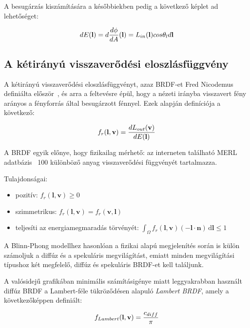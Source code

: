 \vspace{12pt}

\noindent
A besugárzás kiszámítására a későbbiekben pedig a következő képlet ad lehetőséget:

\[
dE(\mathbf{l}) = d { {d\phi} \over {dA} } (\mathbf{l}) = L_{in}(\mathbf{l}) cos\theta_l d\mathbf{l}
\]

\subsection{A kétirányú visszaverődési eloszlásfüggvény}

A kétirányú visszaverődési eloszlásfüggvényt, azaz BRDF-et Fred Nicodemus definiálta először~\cite{nicodemus1965directional}, és arra a feltevésre épül, hogy a nézeti irányba visszavert fény arányos a fényforrás által besugárzott fénnyel. Ezek alapján definíciója a következő:

\[
f_r(\mathbf{l}, \mathbf{v}) = { { dL_{out}(\mathbf{v}) } \over {dE(\mathbf{l})} }
\]

A BRDF egyik előnye, hogy fizikailag mérhető: az interneten található MERL adatbázis~\cite{merl_database} 100 különböző anyag visszaverődési függvényét tartalmazza.

\vspace{12pt}

\noindent
Tulajdonságai:

\begin{itemize}[noitemsep]
\item pozitív: \(f_r(\mathbf{l},\mathbf{v}) \geq 0\)
\item szimmetrikus: \(f_r(\mathbf{l},\mathbf{v}) = f_r(\mathbf{v},\mathbf{l})\)
\item teljesíti az energiamegmaradás törvényét: \(\int_\Omega f_r(\mathbf{l},\mathbf{v}) (-\mathbf{l} \cdot \mathbf{n})\,\mathrm{d}\mathbf{l} \leq 1\)
\end{itemize}

A Blinn-Phong modellhez hasonlóan a fizikai alapú megjelenítés során is külön számoljuk a diffúz és a spekuláris megvilágítást, emiatt minden megvilágítási típushoz két megfelelő, diffúz és spekuláris BRDF-et kell találjunk.

A valósidejű grafikában minimális számításigénye miatt leggyakrabban használt diffúz BRDF a Lambert-féle tükröződésen alapuló \textit{Lambert BRDF}, amely a következőképpen definiált:

\[
f_{Lambert}(\mathbf{l}, \mathbf{v}) = { c_{diff} \over \pi }
\]


